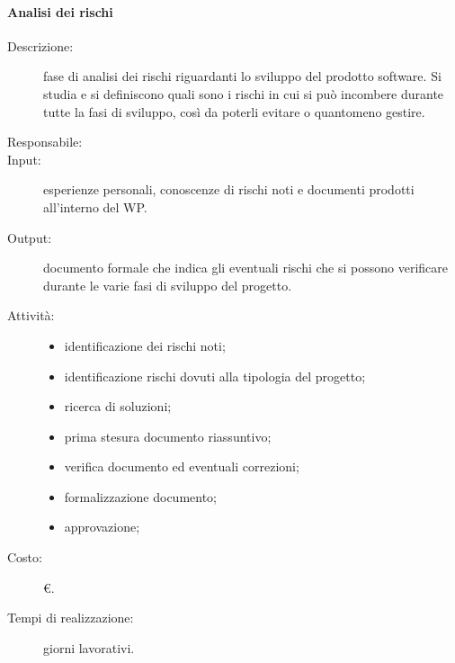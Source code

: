 \paragraph{Analisi dei rischi}
\begin{description}
\item[Descrizione:] fase di analisi dei rischi riguardanti lo sviluppo del prodotto software. Si studia e si definiscono quali sono i rischi in cui si può incombere durante tutte la fasi di sviluppo, così da poterli evitare o quantomeno gestire.
\item[Responsabile:] 
\item[Input:] esperienze personali, conoscenze di rischi noti e documenti prodotti all'interno del WP.
\item[Output:] documento formale che indica gli eventuali rischi che si possono verificare durante le varie fasi di sviluppo del progetto.
\item[Attività:]
\begin{itemize}
\item identificazione dei rischi noti;
\item identificazione rischi dovuti alla tipologia del progetto;
\item ricerca di soluzioni;
\item prima stesura documento riassuntivo;
\item verifica documento ed eventuali correzioni;
\item formalizzazione documento;
\item approvazione;
\end{itemize}
\item[Costo:] \euro{}.
\item[Tempi di realizzazione:]  giorni lavorativi.
\end{description}

